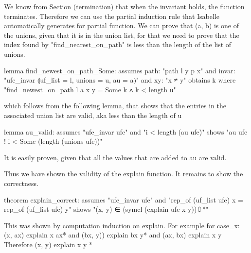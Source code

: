 We know from Section (termination) that when the invariant holds, the function terminates. Therefore we can use the partial induction rule that Isabelle automatically generates for partial function. We can prove that (a, b) is one of the unions, given that it is in the union list, for that we need to prove that the index found by "find_nearest_on_path" is less than the length of the list of unions.

lemma find_newest_on_path_Some:
assumes path: "path l y p x"
and invar: "ufe_invar ⦇uf_list = l, unions = u, au = a⦈"
and xy: "x ≠ y"
obtains k where "find_newest_on_path l a x y = Some k ∧ k < length u"

which follows from the following lemma, that shows that the entries in the associated union list are valid, aka less than the length of u

lemma au_valid:
assumes "ufe_invar ufe"
and "i < length (au ufe)"
shows "au ufe ! i < Some (length (unions ufe))"

It is easily proven, given that all the values that are added to au are valid.

Thus we have shown the validity of the explain function.
It remains to show the correctness.

theorem explain_correct:
assumes "ufe_invar ufe"
and "rep_of (uf_list ufe) x = rep_of (uf_list ufe) y"
shows "(x, y) ∈ (symcl (explain ufe x y))⇧*"

This was shown by computation induction on explain. For example for case_x: 
(x, ax) \in explain x ax* and (bx, y)) \in explain bx y* and (ax, bx) \in explain x y
Therefore (x, y) \in explain x y *
